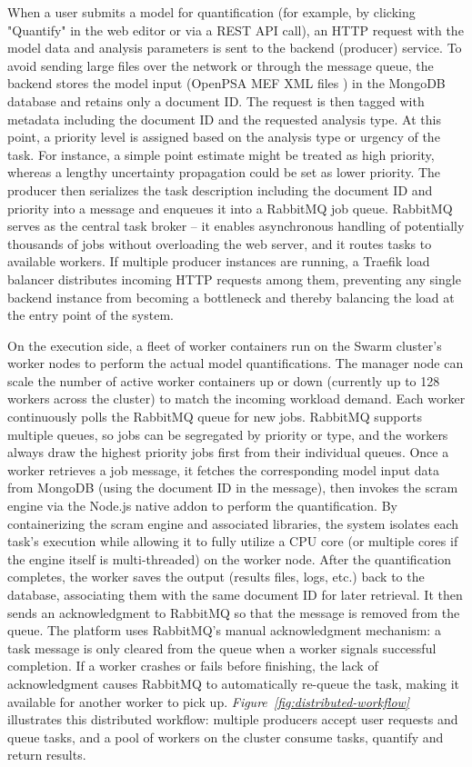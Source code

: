 {When a user submits a model for quantification (for example, by clicking "Quantify" in the web editor or via a REST API call), an HTTP request with the model data and analysis parameters is sent to the backend (producer) service. To avoid sending large files over the network or through the message queue, the backend stores the model input (OpenPSA MEF XML files \cite{2017OpenPSAMEF}) in the MongoDB database and retains only a document ID. The request is then tagged with metadata including the document ID and the requested analysis type. At this point, a priority level is assigned based on the analysis type or urgency of the task. For instance, a simple point estimate might be treated as high priority, whereas a lengthy uncertainty propagation could be set as lower priority. The producer then serializes the task description including the document ID and priority into a message and enqueues it into a RabbitMQ job queue. RabbitMQ serves as the central task broker -- it enables asynchronous handling of potentially thousands of jobs without overloading the web server, and it routes tasks to available workers. If multiple producer instances are running, a Traefik \cite{Traefik} load balancer distributes incoming HTTP requests among them, preventing any single backend instance from becoming a bottleneck and thereby balancing the load at the entry point of the system.

On the execution side, a fleet of worker containers run on the Swarm cluster's worker nodes to perform the actual model quantifications. The manager node can scale the number of active worker containers up or down (currently up to 128 workers across the cluster) to match the incoming workload demand. Each worker continuously polls the RabbitMQ queue for new jobs. RabbitMQ supports multiple queues, so jobs can be segregated by priority or type, and the workers always draw the highest priority jobs first from their individual queues. Once a worker retrieves a job message, it fetches the corresponding model input data from MongoDB (using the document ID in the message), then invokes the scram engine via the Node.js native addon to perform the quantification. By containerizing the scram engine and associated libraries, the system isolates each task's execution while allowing it to fully utilize a CPU core (or multiple cores if the engine itself is multi-threaded) on the worker node. After the quantification completes, the worker saves the output (results files, logs, etc.) back to the database, associating them with the same document ID for later retrieval. It then sends an acknowledgment to RabbitMQ so that the message is removed from the queue. The platform uses RabbitMQ's manual acknowledgment mechanism: a task message is only cleared from the queue when a worker signals successful completion. If a worker crashes or fails before finishing, the lack of acknowledgment causes RabbitMQ to automatically re-queue the task, making it available for another worker to pick up. \emph{Figure~\ref{fig:distributed-workflow}} illustrates this distributed workflow: multiple producers accept user requests and queue tasks, and a pool of workers on the cluster consume tasks, quantify and return results.

}
